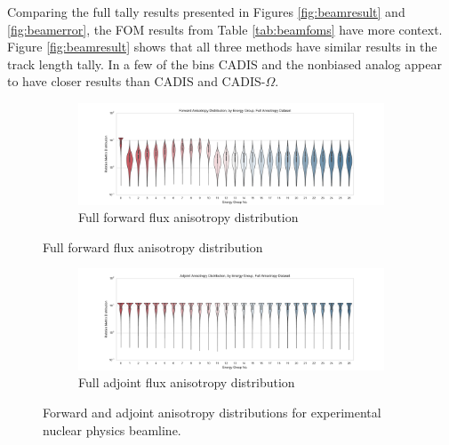 Comparing the full tally results presented in Figures \ref{fig:beamresult} and
\ref{fig:beamerror}, the FOM results from Table \ref{tab:beamfoms} have more
context. Figure \ref{fig:beamresult} shows that all three methods have similar
results in the track length tally. In a few of the bins CADIS and the nonbiased
analog appear to have closer results than CADIS and CADIS-$\Omega$.

\begin{figure}[htb!]
  \centering
  \begin{subfigure}[t]{\textwidth}
    \includegraphics[width=\linewidth]{./chapters/characterization_probs/figures/char/beam/forward_anisotropy_violin_full.pdf}
    \caption{Full forward flux anisotropy distribution}
    \label{fig:forwardbeamline}
  \end{subfigure}
\end{figure}
\begin{figure}[htb!]\ContinuedFloat
  \centering
  \begin{subfigure}[t]{\textwidth}
    \includegraphics[width=\linewidth]{./chapters/characterization_probs/figures/char/beam/adjoint_anisotropy_violin_full.pdf}
    \caption{Full adjoint flux anisotropy distribution}
    \label{fig:adjointbeamline}
  \end{subfigure}
  \caption[Forward and adjoint anisotropy distributions for experimental
  nuclear physics beamline]{Forward and adjoint anisotropy distributions for
  experimental nuclear physics beamline.}
  \label{fig:beamlineplots}
\end{figure}

